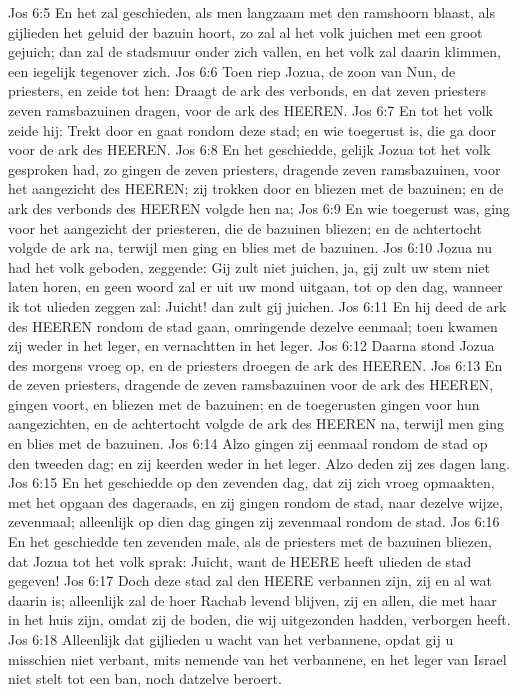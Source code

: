 Jos 6:5  En het zal geschieden, als men langzaam met den ramshoorn blaast, als gijlieden het geluid der bazuin hoort, zo zal al het volk juichen met een groot gejuich; dan zal de stadsmuur onder zich vallen, en het volk zal daarin klimmen, een iegelijk tegenover zich.
Jos 6:6  Toen riep Jozua, de zoon van Nun, de priesters, en zeide tot hen: Draagt de ark des verbonds, en dat zeven priesters zeven ramsbazuinen dragen, voor de ark des HEEREN.
Jos 6:7  En tot het volk zeide hij: Trekt door en gaat rondom deze stad; en wie toegerust is, die ga door voor de ark des HEEREN.
Jos 6:8  En het geschiedde, gelijk Jozua tot het volk gesproken had, zo gingen de zeven priesters, dragende zeven ramsbazuinen, voor het aangezicht des HEEREN; zij trokken door en bliezen met de bazuinen; en de ark des verbonds des HEEREN volgde hen na;
Jos 6:9  En wie toegerust was, ging voor het aangezicht der priesteren, die de bazuinen bliezen; en de achtertocht volgde de ark na, terwijl men ging en blies met de bazuinen.
Jos 6:10  Jozua nu had het volk geboden, zeggende: Gij zult niet juichen, ja, gij zult uw stem niet laten horen, en geen woord zal er uit uw mond uitgaan, tot op den dag, wanneer ik tot ulieden zeggen zal: Juicht! dan zult gij juichen.
Jos 6:11  En hij deed de ark des HEEREN rondom de stad gaan, omringende dezelve eenmaal; toen kwamen zij weder in het leger, en vernachtten in het leger.
Jos 6:12  Daarna stond Jozua des morgens vroeg op, en de priesters droegen de ark des HEEREN.
Jos 6:13  En de zeven priesters, dragende de zeven ramsbazuinen voor de ark des HEEREN, gingen voort, en bliezen met de bazuinen; en de toegerusten gingen voor hun aangezichten, en de achtertocht volgde de ark des HEEREN na, terwijl men ging en blies met de bazuinen.
Jos 6:14  Alzo gingen zij eenmaal rondom de stad op den tweeden dag; en zij keerden weder in het leger. Alzo deden zij zes dagen lang.
Jos 6:15  En het geschiedde op den zevenden dag, dat zij zich vroeg opmaakten, met het opgaan des dageraads, en zij gingen rondom de stad, naar dezelve wijze, zevenmaal; alleenlijk op dien dag gingen zij zevenmaal rondom de stad.
Jos 6:16  En het geschiedde ten zevenden male, als de priesters met de bazuinen bliezen, dat Jozua tot het volk sprak: Juicht, want de HEERE heeft ulieden de stad gegeven!
Jos 6:17  Doch deze stad zal den HEERE verbannen zijn, zij en al wat daarin is; alleenlijk zal de hoer Rachab levend blijven, zij en allen, die met haar in het huis zijn, omdat zij de boden, die wij uitgezonden hadden, verborgen heeft.
Jos 6:18  Alleenlijk dat gijlieden u wacht van het verbannene, opdat gij u misschien niet verbant, mits nemende van het verbannene, en het leger van Israel niet stelt tot een ban, noch datzelve beroert.
